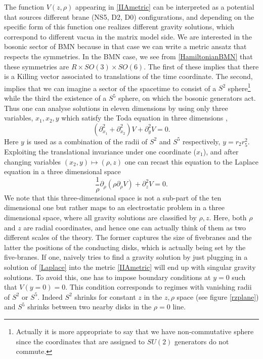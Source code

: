\documentclass[11pt,english]{article}
\newcommand{\be}{\begin{equation}}
\newcommand{\ee}{\end{equation}}
\newcommand{\p}{\partial}
\numberwithin{equation}{section}
\begin{document}
 The function $V(z,\rho)$ appearing in \eqref{IIAmetric} can be interpreted as a potential that sources different brane (NS5, D2, D0) configurations, and depending on the specific form of this function one realizes different gravity solutions, which correspond to different vacua in the matrix model side.  We are interested in the bosonic sector of BMN because in that case we can write a metric ansatz that respects the symmetries. In the BMN case, we see from \eqref{HamiltonianBMN} that these symmetries are $R\times SO(3)\times SO(6)$. The first of these implies that there is a Killing vector associated to translations of the time coordinate. The second, implies that we can imagine a sector of the spacetime to consist of a $S^2$ sphere\footnote{Actually it is more appropriate to say that we have non-commutative sphere since the coordinates that are assigned to $SU(2)$ generators do not commute. } while the third the existence of a $S^5$ sphere, on which the bosonic generators act. Thus one can analyse solutions in eleven dimensions by using only three variables, $x_1,x_2,y$ which satisfy the Toda equation in three dimensions \cite{Lin2004},\cite{Lin2006}
\be \label{toda}
\left(\p_{x_1}^2+\p_{x_2}^2\right)V+\p_y^2V=0.
\ee
Here $y$ is used as a combination of the radii of $S^2$ and $S^5$ respectively, $y=r_2r_5^2$. Exploiting the translational invariance under one coordinate ($x_1$), and after changing variables $(x_2,y)\mapsto(\rho,z)$ one can recast this equation to the Laplace equation in a three dimensional space \cite{Lin2004}
\be \label{Laplace}
\frac{1}{\rho}\p_\rho\left(\rho\p_\rho V\right)+\p_z^2V=0.
\ee
We note that this three-dimensional space is not a sub-part of the ten dimensional one but rather maps to an electrostatic problem in a three dimensional space, where all gravity solutions are classified by $\rho,z$. Here, both $\rho$ and $z$ are radial coordinates, and hence one can actually think of them as two different scales of the theory. The former captures  the size of fivebranes and the latter the positions of the conducting disks, which is actually being set by the five-branes.  
If one, naively tries to find a gravity solution by just plugging in a solution of  \eqref{Laplace} into the metric \eqref{IIAmetric} will end up with singular gravity solutions. To avoid this, one has to impose boundary conditions at $y=0$ such that $V(y=0)=0$. This condition corresponds to regimes with vanishing radii of $S^2$ or $S^5$. Indeed $S^2$ shrinks for constant $z$ in the $z,\rho$ space (see figure \ref{rzplane}) and $S^5$ shrinks between two nearby disks in the $\rho=0$ line. 
\end{document}
